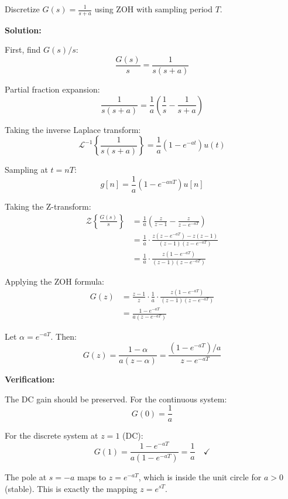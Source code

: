 \begin{example}
\label{ex:zoh_first_order}

Discretize $G(s) = \frac{1}{s+a}$ using ZOH with sampling period $T$.

\textbf{Solution:}

First, find $G(s)/s$:
\begin{equation}
\frac{G(s)}{s} = \frac{1}{s(s+a)}
\end{equation}

Partial fraction expansion:
\begin{equation}
\frac{1}{s(s+a)} = \frac{1}{a}\left(\frac{1}{s} - \frac{1}{s+a}\right)
\end{equation}

Taking the inverse Laplace transform:
\begin{equation}
\mathcal{L}^{-1}\left\{\frac{1}{s(s+a)}\right\} = \frac{1}{a}(1 - e^{-at})u(t)
\end{equation}

Sampling at $t = nT$:
\begin{equation}
g[n] = \frac{1}{a}(1 - e^{-anT})u[n]
\end{equation}

Taking the Z-transform:
\begin{align}
\mathcal{Z}\left\{\frac{G(s)}{s}\right\} &= \frac{1}{a}\left(\frac{z}{z-1} - \frac{z}{z-e^{-aT}}\right) \\
&= \frac{1}{a} \cdot \frac{z(z-e^{-aT}) - z(z-1)}{(z-1)(z-e^{-aT})} \\
&= \frac{1}{a} \cdot \frac{z(1-e^{-aT})}{(z-1)(z-e^{-aT})}
\end{align}

Applying the ZOH formula:
\begin{align}
G(z) &= \frac{z-1}{z} \cdot \frac{1}{a} \cdot \frac{z(1-e^{-aT})}{(z-1)(z-e^{-aT})} \\
&= \frac{1-e^{-aT}}{a(z-e^{-aT})}
\end{align}

Let $\alpha = e^{-aT}$. Then:
\begin{equation}
\boxed{G(z) = \frac{1-\alpha}{a(z-\alpha)} = \frac{(1-e^{-aT})/a}{z-e^{-aT}}}
\end{equation}

\textbf{Verification:}

The DC gain should be preserved. For the continuous system:
\begin{equation}
G(0) = \frac{1}{a}
\end{equation}

For the discrete system at $z = 1$ (DC):
\begin{equation}
G(1) = \frac{1-e^{-aT}}{a(1-e^{-aT})} = \frac{1}{a} \quad \checkmark
\end{equation}

The pole at $s = -a$ maps to $z = e^{-aT}$, which is inside the unit circle for $a > 0$ (stable). This is exactly the mapping $z = e^{sT}$.
\end{example}

